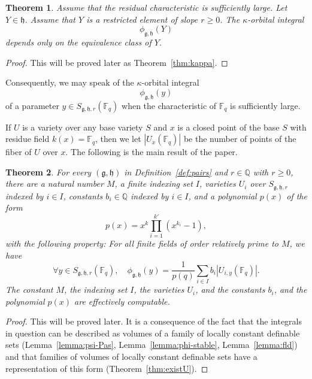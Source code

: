 \documentclass[11pt]{amsart}
\newtheorem{theorem}{Theorem}[section]
\theoremstyle{definition}
\theoremstyle{remark}
\numberwithin{equation}{theorem}
\def\f{{\mathbb{F}_q}}
\newcommand{\ring}[1]{\mathbb{#1}}
\def\lie#1{{\mathfrak{#1}}}
\def\orb#1#2{{\phi_{\lie{#1},\lie{#2}}}}
\begin{document}
\begin{theorem}  Assume that the residual
characteristic is sufficiently large. Let $Y\in\lie{h}$. Assume
that $Y$ is a restricted  element of slope $r\ge0$.  The
$\kappa$-orbital integral
  \begin{equation}\orb{g}{h}(Y)\end{equation}
depends only on the equivalence class of $Y$.
\end{theorem}

\begin{proof}  This will be proved later as
Theorem~\ref{thm:kappa}.
\end{proof}

Consequently, we may speak of the $\kappa$-orbital integral
   \begin{equation}
   \orb{g}{h}(y)
   \end{equation}
of a parameter $y\in S_{\lie{g},\lie{h},r}(\f)$ when the
characteristic of $\f$ is sufficiently large.

If $U$ is a variety over any base variety $S$ and $x$ is a closed
point of the base $S$ with residue field $k(x)=\f$, then we let
$|U_x(\f)|$ be the number of points of the fiber of $U$ over $x$.
The following is the main result of the paper.


\begin{theorem}\label{thm:variety}
For every $(\lie{g},\lie{h})$ in Definition~\ref{def:pairs} and
$r\in\ring{Q}$ with $r\ge0$, there are a natural number $M$, a
finite indexing set $I$, varieties $U_i$ over
$S_{\lie{g},\lie{h},r}$ indexed by $i\in I$, constants
$b_i\in\ring{Q}$ indexed by $i\in I$, and a polynomial $p(x)$ of
the form
   \begin{equation}
   p(x) = x^k \prod_{i=1}^{k'} (x^{k_i} - 1),
   \end{equation}
with the following property: For all finite fields of order
relatively prime to $M$, we have
  \begin{equation}
  \forall y\in S_{\lie{g},\lie{h},r}(\f),\quad \orb{g}{h}(y)
    = \frac{1}{p(q)}\sum_{i\in I} b_i |U_{i,y}(\f)|.
  \end{equation}
The constant $M$, the indexing set $I$, the varieties $U_i$, and
the constants $b_i$, and the polynomial $p(x)$  are effectively
computable.
\end{theorem}

\begin{proof}  This will be proved later.  It is a consequence of
the fact that the integrals in question can be described as
volumes of a family of locally constant definable sets
(Lemma~\ref{lemma:psi-Pas}, Lemma~\ref{lemma:phi-stable},
Lemma~\ref{lemma:fld}) and that families of volumes of locally
constant definable sets have a representation of this form
(Theorem~\ref{thm:existU}).
\end{proof}
\end{document}
